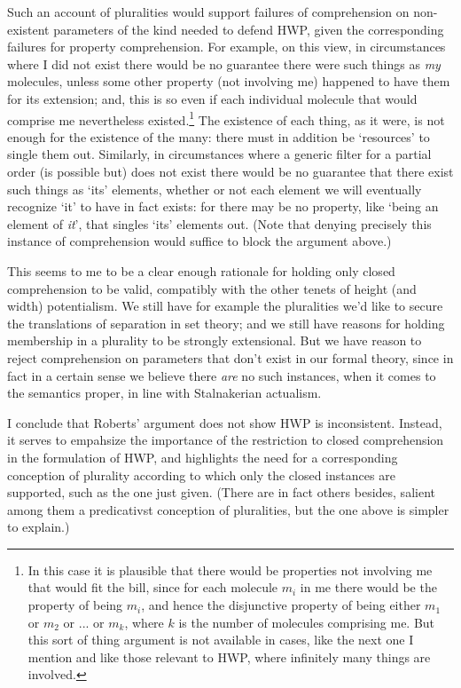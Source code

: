 \documentclass{article}
\begin{document}
Such an account of pluralities would support
failures of comprehension on non-existent parameters of 
the kind needed to defend HWP, given the corresponding 
failures for property comprehension.
For example, on this view, 
in circumstances where 
I did not exist there would be no guarantee there 
were such things as \emph{my} molecules,
unless some other property (not involving me) happened 
to have them for its extension;
and, this is so even if each individual molecule 
that would comprise me nevertheless existed.\footnote{
    In this case it is plausible that there would be properties
    not involving me that would fit the bill, 
    since for each molecule $m_i$ in me there 
    would be the property of being $m_i$, and 
    hence the disjunctive property of being either 
    $m_1$ or $m_2$ or ... or $m_k$, where $k$ 
    is the number of molecules comprising me. But this sort of thing argument 
    is not available in cases, like the next one I mention and like those 
    relevant to HWP,
    where infinitely many things are involved. 
}
The existence of each thing, as it were, is not 
enough for the existence of the many: there must 
in addition be `resources' to single them out.
Similarly, 
in circumstances where a generic filter
for a partial order (is possible but) does not exist there would be no guarantee 
that there exist such things 
as `its' elements, whether or not each element we will eventually 
recognize `it' to have in fact exists: for there may be no property, like 
`being an element of \emph{it}', that singles `its' elements out. 
(Note that denying precisely this instance of comprehension 
would suffice to block the argument above.)

This seems to me to be a clear enough rationale for holding only closed comprehension 
to be valid, compatibly with the other tenets of height (and width) potentialism.
We still have for example the pluralities we'd like to secure the translations 
of separation in set theory; and we still have reasons for holding membership in 
a plurality to be strongly extensional. But we have reason to reject 
comprehension on parameters that don't exist in our formal theory, since 
in fact in a certain sense 
we believe there \emph{are} no such instances, when it comes to the semantics proper,
in line with Stalnakerian actualism.

I conclude that Roberts' argument does not show HWP is inconsistent.
Instead, it serves to empahsize the importance of the 
restriction to closed comprehension
in the formulation of HWP, 
and highlights the need for a corresponding conception of 
plurality according to which 
only the closed instances are supported, such as the one just given. 
(There are in fact others besides, salient among them a predicativst 
conception of pluralities, but the one above is simpler to explain.)
\end{document}
